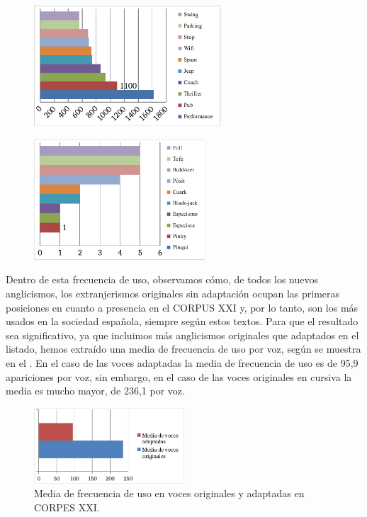 \documentclass{textolivre}
\begin{document}
\begin{figure}[htbp]
\begin{minipage}{0.47\textwidth}
\includegraphics[height=4.5cm]{figure04.pdf}
\label{fig-04}
\end{minipage}
\hfill
\begin{minipage}{0.47\textwidth}
\includegraphics[height=4.5cm]{figure05.pdf}
\label{fig-05}
\end{minipage}
\caption{ }
\label{fig-diezvoces}
\end{figure}

Dentro de esta frecuencia de uso, observamos cómo, de todos los nuevos anglicismos, los extranjerismos originales sin adaptación ocupan las primeras posiciones en cuanto a presencia en el CORPUS XXI y, por lo tanto, son los más usados en la sociedad española, siempre según estos textos. Para que el resultado sea significativo, ya que incluimos más anglicismos originales que adaptados en el listado, hemos extraído una media de frecuencia de uso por voz, según se muestra en el . En el caso de las voces adaptadas la media de frecuencia de uso es de 95,9 apariciones por voz, sin embargo, en el caso de las voces originales en cursiva la media es mucho mayor, de 236,1 por voz.

\begin{figure}[htbp]
 \centering
 \includegraphics[width=0.5\textwidth]{figure06.pdf}
 \caption{Media de frecuencia de uso en voces originales y adaptadas en CORPES XXI.}
 \label{fig-06}
\end{figure}
\end{document}
